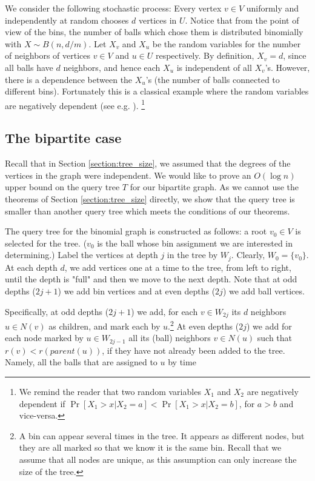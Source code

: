 \documentclass[english, oribibl]{llncs}
\begin{document}
We consider the following stochastic process: 
Every vertex $v \in V$ uniformly and independently at random chooses $d$ vertices in $U$.
Notice that from the point of view of the bins,
the number of balls which chose them is distributed binomially with $X \sim B(n, d/m)$.
Let $X_v$ and $X_u$ be the random variables for the number of neighbors of vertices $v \in V$ and $u \in U$ respectively.
By definition, $X_v=d$, since all balls have $d$ neighbors, and hence
each $X_u$ is independent of all $X_v$'s.
However, there is a dependence between the $X_u$'s (the number of balls connected to different bins).
Fortunately this is a classical example where the random variables are negatively dependent (see e.g. \cite{DR96}).
\footnote{We remind the reader that two random variables $X_1$ and $X_2$ are negatively dependent if
$\Pr[X_1>x|X_2 = a] < \Pr[X_1>x|X_2 = b]$, for $a>b$ and vice-versa.}

\subsection{The bipartite case}
Recall that in Section \ref{section:tree_size},
we assumed that the degrees of the vertices in the graph were independent.
We would like to prove an $O(\log{n})$ upper bound on the query tree $T$ for our bipartite graph.  As we cannot use the theorems of Section \ref{section:tree_size}
directly, we show that the query tree is smaller than another query tree which meets the conditions of our theorems.

The query tree for the binomial graph is constructed as follows: a root $v_0 \in V$ is selected for the tree. ($v_0$ is the ball whose bin assignment we are interested in determining.)            Label the vertices at depth $j$ in
the tree by $W_j$. Clearly, $W_0= \{v_0\}$. At each depth $d$, we add vertices one at a time to the tree, from left to right, until the depth is "full" and then we 
move to the next depth. Note that at odd depths ($2j+1$) we add bin vertices and at even depths ($2j$) we add ball vertices.

Specifically, at odd depths ($2j+1$) we add, for each $v\in W_{2j}$ its $d$ neighbors $u \in N(v)$ as children, and mark each by $u$.\footnote{A bin can appear several times in the tree. 
It appears as different nodes, but they are all marked so that we know it is the same bin. Recall that we assume that all nodes are unique, as this assumption can only increase the size of the tree.}
At even depths ($2j$) we add for each node marked by $u\in W_{2j-1}$ all its (ball) neighbors $v\in N(u)$ such that $r(v) < r(parent(u))$, if they have not already been added to the tree. Namely, all the balls that are assigned to $u$ by time
\end{document}

